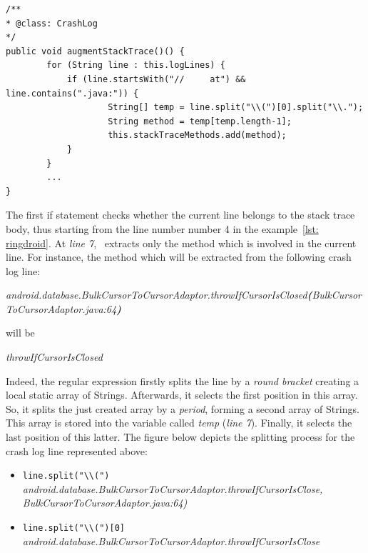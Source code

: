\begin{enumerate}
\begin{lstlisting}[caption=Regular expression for extracting all methods from a stack trace,label={lst: augmentstack}]
/**
* @class: CrashLog
*/
public void augmentStackTrace()() {
        for (String line : this.logLines) {
            if (line.startsWith("// 	at") && line.contains(".java:")) {
            		String[] temp = line.split("\\(")[0].split("\\.");
            		String method = temp[temp.length-1];
            		this.stackTraceMethods.add(method);
            }
        }
        ...
}
\end{lstlisting}
The first if statement checks whether the current line belongs to the stack trace body, thus starting from the line number number 4 in the example~\ref{lst: ringdroid}. 
At \textit{line 7}, \toolname\ extracts only the method which is involved in the current line. 
For instance, the method which will be extracted from the following crash log line: 
\begin{center}
\smallbreak
\emph{\small android.database.BulkCursorToCursorAdaptor.throwIfCursorIsClosed\textbf{(}BulkCursorToCursorAdaptor.java:64\textbf{)}}
\end{center} 
will be
\begin{center}
\emph{throwIfCursorIsClosed}
\end{center} 
Indeed, the regular expression firstly splits the line by a \textit{round bracket} creating a local static array of Strings. Afterwards, it selects the first position in this array. So, it splits the just created array by a \textit{period}, forming a second array of Strings. 
This array is stored into the variable called \textit{temp} (\textit{line 7}).
Finally, it selects the last position of this latter. 
The figure below depicts the splitting process for the crash log line represented above: 
\begin{itemize}

\item \texttt{line.split({\color{blue}"\textbackslash\textbackslash("})} \\
\emph{android.database.BulkCursorToCursorAdaptor.throwIfCursorIsClose,\\ BulkCursorToCursorAdaptor.java:64)}


\item \texttt{line.split({\color{blue}"\textbackslash\textbackslash("})[0]} \\
\emph{android.database.BulkCursorToCursorAdaptor.throwIfCursorIsClose}


\end{itemize}
\end{enumerate}
